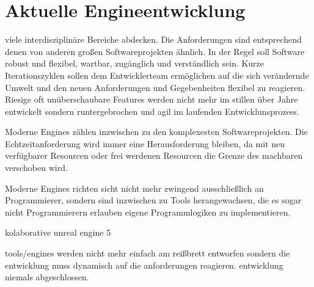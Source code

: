 \chapter{Aktuelle Engineentwicklung}
\label{chap:engine-uebersicht}

viele interdisziplinäre Bereiche abdecken. Die Anforderungen sind entsprechend denen von anderen großen Softwareprojekten ähnlich. In der Regel soll Software robust und flexibel, wartbar, zugänglich und verständlich sein. Kurze Iterationszyklen sollen dem Entwicklerteam ermöglichen auf die sich verändernde Umwelt und den neuen Anforderungen und Gegebenheiten flexibel zu reagieren. Riesige oft unüberschaubare Features werden nicht mehr im stillen über Jahre entwickelt sondern runtergebrochen und agil im laufenden Entwicklunsprozess.

Moderne Engines zählen inzwischen zu den komplexesten Softwareprojekten. Die Echtzeitanforderung wird immer eine Herausforderung bleiben, da mit neu verfügbarer Resourcen oder frei werdenen Resourcen die Grenze des machbaren verschoben wird.

Moderne Engines richten sicht nicht mehr zwingend ausschließlich an Programmierer, sondern sind inzwischen zu Tools herangewachsen, die es sogar nicht Programmierern erlauben eigene Programmlogiken zu implementieren.

kolaborative unreal engine 5

tools/engines werden nicht mehr einfach am reißbrett entworfen sondern die entwicklung muss dynamisch auf die anforderungen reagieren.
entwicklung niemals abgeschlossen. 
